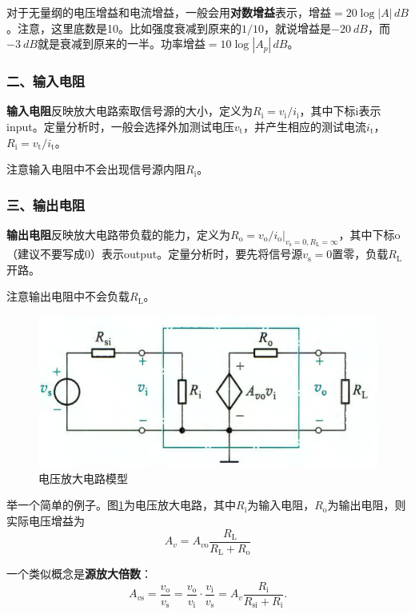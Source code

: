 对于无量纲的电压增益和电流增益，一般会用\textbf{对数增益}表示，$\text{增益}=20\log|A|\,\si{dB}$。注意，这里底数是10。比如强度衰减到原来的$1/10$，就说增益是$\qty{-20}{dB}$，而$\qty{-3}{dB}$就是衰减到原来的⼀半。$\text{功率增益}=10\log|A_p|\,\si{dB}$。

\subsubsection{二、输入电阻}
\textbf{输入电阻}反映放大电路索取信号源的大小，定义为$R_\mathrm{i}=v_\mathrm{i}/i_\mathrm{i}$，其中下标i表示input。定量分析时，一般会选择外加测试电压$v_\mathrm{t}$，并产生相应的测试电流$i_\mathrm{t}$，$R_\mathrm{i}=v_\mathrm{t}/i_\mathrm{t}$。

注意输入电阻中不会出现信号源内阻$R_{\mathrm{i}}$。

\subsubsection{三、输出电阻}
\textbf{输出电阻}反映放大电路带负载的能力，定义为$R_\mathrm{o}=v_\mathrm{o}/i_\mathrm{o}|_{v_\mathrm{s}=0,R_\mathrm{L}=\infty}$，其中下标o（建议不要写成0）表示output。定量分析时，要先将信号源$v_\mathrm{s}=0$置零，负载$R_\mathrm{L}$开路。

注意输出电阻中不会负载$R_{\mathrm{L}}$。

\begin{figure}[htb]
    \centering
    \includegraphics[width=0.5\linewidth]{pic/电压放大电路模型.png}
    \caption{电压放大电路模型\cite{康华光}\label{电压放大电路模型}}
\end{figure}

举一个简单的例子。图\ref{电压放大电路模型}为电压放大电路，其中$R_\mathrm{i}$为输入电阻，$R_\mathrm{o}$为输出电阻，则实际电压增益为
\begin{equation}
    A_v=A_{v\mathrm{o}}\frac{R_{\mathrm{L}}}{R_{\mathrm{L}}+R_{\mathrm{o}}}
\end{equation}

⼀个类似概念是\textbf{源放大倍数}：
\begin{equation}
    A_{v\mathrm{s}}=\frac{v_{\mathrm{o}}}{v_{\mathrm{s}}}=\frac{v_{\mathrm{o}}}{v_{\mathrm{i}}}\cdot \frac{v_{\mathrm{i}}}{v_{\mathrm{s}}}=A_v\frac{R_{\mathrm{i}}}{R_{\mathrm{si}}+R_{\mathrm{i}}}.
\end{equation}

